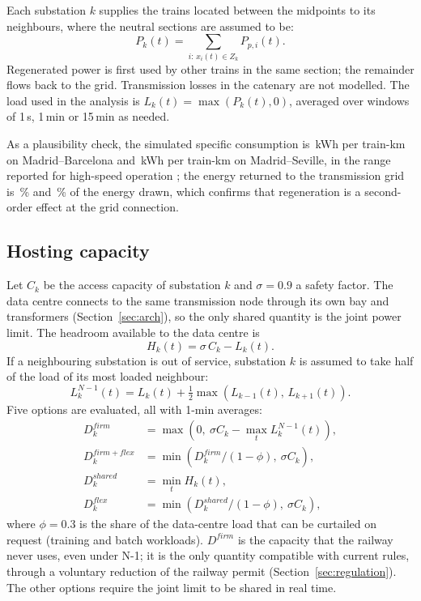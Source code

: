 Each substation $k$ supplies the trains located between the midpoints to its neighbours, where the neutral sections are assumed to be:
\begin{equation}
P_k(t) = \sum_{i:\,x_i(t)\in Z_k} P_{p,i}(t).
\label{eq:sub}
\end{equation}
Regenerated power is first used by other trains in the same section; the remainder flows back to the grid. Transmission losses in the catenary are not modelled. The load used in the analysis is $L_k(t)=\max(P_k(t),0)$, averaged over windows of 1\,s, 1\,min or 15\,min as needed.

As a plausibility check, the simulated specific consumption is \mzbSpecific\,kWh per train-km on Madrid--Barcelona and \msSpecific\,kWh per train-km on Madrid--Seville, in the range reported for high-speed operation \cite{douglas2015}; the energy returned to the transmission grid is \mzbBackPct\,\% and \msBackPct\,\% of the energy drawn, which confirms that regeneration is a second-order effect at the grid connection.

\subsection{Hosting capacity}

Let $C_k$ be the access capacity of substation $k$ and $\sigma=0.9$ a safety factor. The data centre connects to the same transmission node through its own bay and transformers (Section~\ref{sec:arch}), so the only shared quantity is the joint power limit. The headroom available to the data centre is
\begin{equation}
H_k(t) = \sigma\,C_k - L_k(t).
\label{eq:headroom}
\end{equation}
If a neighbouring substation is out of service, substation $k$ is assumed to take half of the load of its most loaded neighbour:
\begin{equation}
L^{N-1}_k(t) = L_k(t) + \tfrac{1}{2}\max\left(L_{k-1}(t),\,L_{k+1}(t)\right).
\label{eq:n1}
\end{equation}
Five options are evaluated, all with 1-min averages:
\begin{align}
D^{firm}_k &= \max\left(0,\ \sigma C_k - \max_t L^{N-1}_k(t)\right), \label{eq:firm}\\
D^{firm+flex}_k &= \min\left(D^{firm}_k/(1-\phi),\ \sigma C_k\right), \label{eq:firmflex}\\
D^{shared}_k &= \min_t H_k(t), \label{eq:shared}\\
D^{flex}_k &= \min\left(D^{shared}_k/(1-\phi),\ \sigma C_k\right), \label{eq:flex}
\end{align}
where $\phi=0.3$ is the share of the data-centre load that can be curtailed on request (training and batch workloads). $D^{firm}$ is the capacity that the railway never uses, even under N-1; it is the only quantity compatible with current rules, through a voluntary reduction of the railway permit (Section~\ref{sec:regulation}). The other options require the joint limit to be shared in real time.

